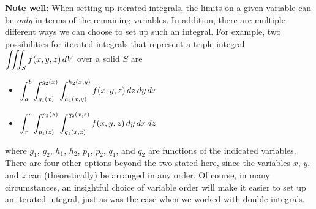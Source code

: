 \noindent \textbf{Note well: } When setting up iterated integrals, the limits on a given variable can be {\em only} in terms of the remaining variables.  In addition, there are multiple different ways we can choose to set up such an integral.  For example, two possibilities for iterated integrals that represent a triple integral $\displaystyle \iiint_S f(x,y,z) \, dV$ over a solid $S$ are
\begin{itemize}
\item $\displaystyle \int_a^b \int_{g_1(x)}^{g_2(x)} \int_{h_1(x,y)}^{h_2(x,y)} f(x,y,z) \, dz \, dy \, dx$
\item $\displaystyle \int_r^s \int_{p_1(z)}^{p_2(z)} \int_{q_1(x,z)}^{q_2(x,z)} f(x,y,z) \, dy \, dx \, dz$
\end{itemize}
where $g_1$, $g_2$, $h_1$, $h_2$, $p_1$, $p_2$, $q_1$, and $q_2$ are functions of the indicated variables.  There are four other options beyond the two stated here, since the variables $x$, $y$, and $z$ can (theoretically) be arranged in any order.   Of course, in many circumstances, an insightful choice of variable order will make it easier to set up an iterated integral, just as was the case when we worked with double integrals.

